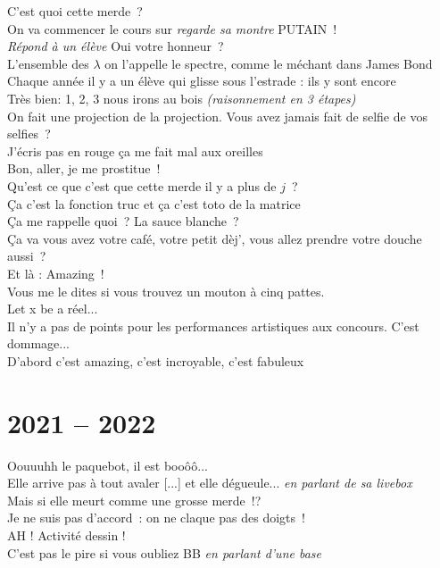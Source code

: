 \documentclass[french, a4paper, openany]{book}
\begin{document}
	\noindent \og C'est quoi cette merde~? \fg \\
	\og On va commencer le cours sur \emph{regarde sa montre} PUTAIN~! \fg \\
	\emph{Répond à un élève} \og Oui votre honneur~? \fg \\
	\og L'ensemble des $\lambda$ on l'appelle le spectre, comme le méchant dans James Bond \fg \\
	\og Chaque année il y a un élève qui glisse sous l'estrade : ils y sont encore \fg \\
	\og Très bien: 1, 2, 3 nous irons au bois \fg \emph{(raisonnement en 3 étapes)} \\
	\og On fait une projection de la projection. Vous avez jamais fait de selfie de vos selfies~? \fg \\
	\og J'écris pas en rouge ça me fait mal aux oreilles \fg \\
	\og Bon, aller, je me prostitue~! \fg \\
	\og Qu'est ce que c'est que cette merde il y a plus de $j$~? \fg \\
	\og Ça c'est la fonction truc et ça c'est toto de la matrice \fg \\
	\og Ça me rappelle quoi~? La sauce blanche~? \fg \\
	\og Ça va vous avez votre café, votre petit dèj', vous allez prendre votre douche aussi~? \fg \\
	\og Et là : Amazing~! \fg \\
	\og Vous me le dites si vous trouvez un mouton à cinq pattes. \fg \\
	\og Let x be a réel... \fg \\
	\og Il n'y a pas de points pour les performances artistiques aux concours. C'est dommage... \fg \\
	\og D'abord c'est amazing, c'est incroyable, c'est fabuleux \fg \\

\section{2021 -- 2022}

	\noindent \og Oouuuhh le paquebot, il est booôô... \fg \\
	\og Elle arrive pas à tout avaler [...] et elle dégueule... \fg \emph{en parlant de sa livebox} \\
	\og Mais si elle meurt comme une grosse merde~!? \fg \\
	\og Je ne suis pas d'accord~: on ne claque pas des doigts~! \fg \\
	\og AH ! Activité dessin ! \fg \\
	\og C'est pas le pire si vous oubliez BB \fg \emph{en parlant d'une base} \\
	
\end{document}
